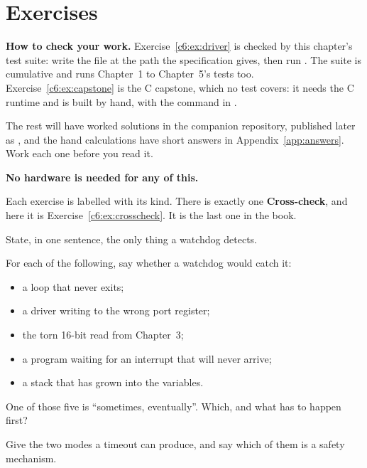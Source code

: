 
\section{Exercises}
\label{c6:sec:exercises}

\begin{aside}
\textbf{How to check your work.} Exercise~\ref{c6:ex:driver} is checked by this chapter's test
suite: write the file at the path the specification gives, then run . The suite is
cumulative and runs Chapter~1 to Chapter~5's tests too. Exercise~\ref{c6:ex:capstone} is the C
capstone, which no test covers: it needs the C runtime and is built by hand, with the command in
.

The rest will have worked solutions in the companion repository, published later as
, and the hand calculations have short answers in
Appendix~\ref{app:answers}. Work each one before you read it.

\textbf{No hardware is needed for any of this.}
\end{aside}

Each exercise is labelled with its kind. There is exactly one \textbf{Cross-check}, and here it is
Exercise~\ref{c6:ex:crosscheck}. It is the last one in the book.

\label{c6:ex:catches}
\begin{parts}
  \item State, in one sentence, the only thing a watchdog detects.
  \item For each of the following, say whether a watchdog would catch it:
    \begin{itemize}
      \item a loop that never exits;
      \item a driver writing to the wrong port register;
      \item the torn 16-bit read from Chapter~3;
      \item a program waiting for an interrupt that will never arrive;
      \item a stack that has grown into the variables.
    \end{itemize}
  \item One of those five is ``sometimes, eventually''. Which, and what has to happen first?
  \item Give the two modes a timeout can produce, and say which of them is a safety mechanism.
\end{parts}

